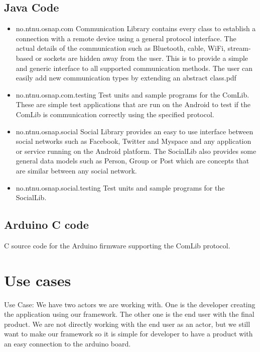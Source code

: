 \subsection{Java Code}
\begin{itemize}
\item{no.ntnu.osnap.com}\newline
Communication Library contains every class to establish a connection with a remote device using a general protocol interface. The actual details of the communication such as
Bluetooth, cable, WiFi, stream-based or sockets are hidden away from the user. This is to provide a simple and generic interface to all supported communication methods. The
user can easily add new communication types by extending an abstract class.pdf
\item{no.ntnu.osnap.com.testing}\newline
Test units and sample programs for the ComLib. These are simple test applications that are run on the Android to test if the ComLib is communication correctly using the specified
protocol.
\item{no.ntnu.osnap.social}\newline
Social Library provides an easy to use interface between social networks such as Facebook, Twitter and Myspace and any application or service running on the Android platform.
The SocialLib also provides some general data models such as Person, Group or Post which are concepts that are similar between any social network. 
\item{no.ntnu.osnap.social.testing}  \newline
Test units and sample programs for the SocialLib.
\end{itemize}

\subsection{Arduino C code}
C source code for the Arduino firmware supporting the ComLib protocol.


\section{Use cases}
Use Case:
We have two actors we are working with. One is the developer creating the application using our framework.
The other one is the end user with the final product. We are not directly working with the end user as an actor,
but we still want to make our framework so it is simple for developer to have a product with an easy connection to the arduino board.

